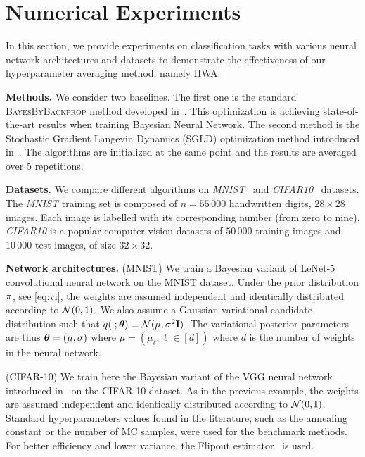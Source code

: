 \documentclass{article} %
\begin{document}
\section{Numerical Experiments}\label{sec:numerical}
In this section, we provide experiments on classification tasks with various neural network architectures and datasets to demonstrate the effectiveness of our hyperparameter averaging method, namely HWA.

\textbf{Methods.}\hspace{0.1in}
We consider two baselines. 
The first one is the standard \textsc{BayesByBackprop} method developed in~\citep{blundell2015weight}. 
This optimization is achieving state-of-the-art results when training Bayesian Neural Network.
The second method is the Stochastic Gradient Langevin Dynamics (SGLD) optimization method introduced in~\citep{welling2011bayesian}.
The algorithms are initialized at the same point and the results are averaged over 5 repetitions.


\textbf{Datasets.}\hspace{0.1in}
We compare different algorithms on \textit{MNIST}~\citep{lecun-mnisthandwrittendigit-2010} and \textit{CIFAR10}~\citep{krizhevsky2009learning} datasets.
The \textit{MNIST} training set is composed of $n=55\,000$ handwritten digits, $28 \times 28$ images. Each image is labelled with its corresponding number (from zero to nine).
\textit{CIFAR10} is a popular computer-vision datasets of $50\,000$ training images and $10\,000$ test images, of size $32\times 32$. 

\textbf{Network architectures.} \hspace{0.1in}
(MNIST) We train a Bayesian variant of LeNet-5 convolutional neural network on the MNIST dataset. 
Under the prior distribution $\prior$, see \eqref{eq:vi}, the weights are assumed  independent and identically distributed according to ${\cal N}(0,1)$.
We also assume a Gaussian variational candidate distribution such that $q(\cdot; \param) \equiv  \mathcal{N}(\mu,\sigma^2 \Id )$.
The variational posterior parameters are thus $\param = (\mu, \sigma) $ where $\mu = (\mu_\ell, \ell \in [d])$ where $d$ is the number of weights in the neural network. 


(CIFAR-10) We train here the Bayesian variant of the VGG neural network introduced in~\citep{simonyan2014very} on the CIFAR-10 dataset.
As in the previous example, the weights are assumed  independent and identically distributed according to ${\cal N}(0,\Id)$.
Standard hyperparameters values found in the literature, such as the annealing constant or the number of MC samples, were used for the benchmark methods. 
For better efficiency and lower variance, the Flipout estimator~\citep{wen2018flipout} is used.
\end{document}
